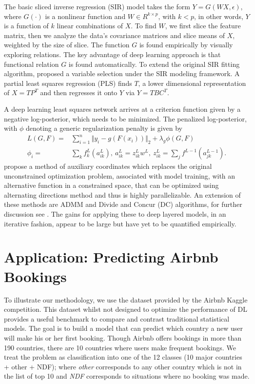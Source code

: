 \documentclass[12pt]{article}
\newcommand{\enorm}[1]{\Vert #1 \Vert_2}
\begin{document}
The basic sliced inverse regression (SIR) model takes the form  $Y = G(WX,\epsilon)$, where $G(\cdot)$ is a nonlinear function and $W \in R^{k \times p}$, with $k <p$, in other words, $Y$ is a function of $k$ linear combinations of $X$. To find $W$, we first slice the feature matrix, then we analyze the data's covariance matrices and slice means of $X$, weighted by the size of slice. The function $G$ is found empirically by visually exploring relations. The key advantage of deep learning approach is that functional relation $G$ is found automatically. To extend the original SIR fitting algorithm, \cite{jiang2013sliced} proposed a variable selection under the SIR modeling framework.
A partial least squares regression (PLS) \citep{wold2001} finds $T$, a lower dimensional representation of   $X = TP^T$ and then regresses it onto $Y$ via  $Y = TBC^T$.

A deep learning least squares network arrives at a criterion function given by  a negative log-posterior, which needs to be minimized. The penalized log-posterior, with $ \phi $ denoting a generic regularization penalty is given by
\begin{align*}
L( G , F ) = &\sum_{i=1}^n \enorm{ y_i - g (F (x_i) ) } + \lambda_g \phi (G,F)\\
\phi_i = &\sum_k f_k^L(a_{ik}^L),~a_{ik}^L = z_{ik}^Lw^L,~z_{ik}^L = \sum_j f^{L-1}(a^{L-1}_{jk}).
\end{align*}
\cite{carreira2014distributed} propose a method of auxiliary coordinates which replaces the original unconstrained optimization problem, associated with model training, with an alternative function in a constrained space, that can be optimized using alternating directions method and thus is highly parallelizable. 
An extension of these methods are ADMM and Divide and Concur (DC) algorithms, for further discussion see \cite{polson_proximal_2015}.
The gains for applying these to deep layered models, in an iterative fashion, appear to be large but have yet to be quantified empirically.

\section{Application: Predicting Airbnb Bookings}
To illustrate our methodology, we use the dataset provided by the
Airbnb Kaggle competition. This dataset whilst not designed to optimize
the performance of DL provides a useful benchmark to compare and
contrast traditional statistical models. The goal is to build a
model that can predict  which country a new user will make his or her
first booking. Though Airbnb offers bookings in more than 190
countries, there are 10 countries where users make frequent bookings.
We treat the problem as classification into one of the 12 classes (10
major countries + other + NDF); where \textit{other} corresponds to any
other country which is not in the list of top 10 and \textit{NDF}
corresponds to situations where no booking was made.
\end{document}
